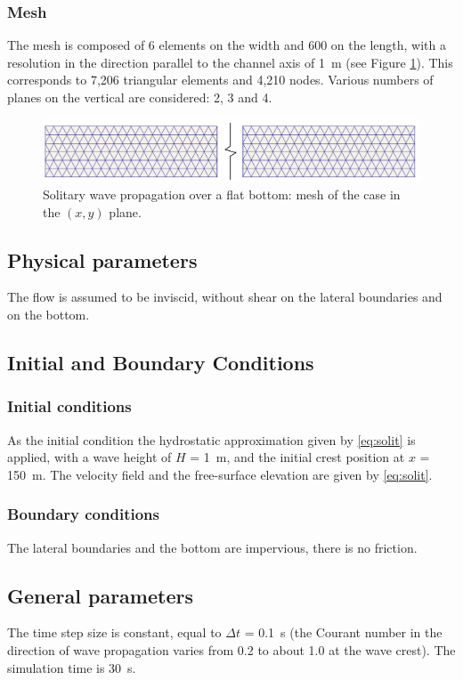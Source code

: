 \subsubsection{Mesh}
The mesh is composed of 6 elements on the width and 600 on the length,
with a resolution in the direction parallel to the channel axis of 1~m
(see Figure \ref{fig:solit_mesh}).
This corresponds to 7,206 triangular elements and 4,210 nodes.
Various numbers of planes on the vertical are considered: 2, 3 and 4.
\begin{figure}[H]
\begin{center}
  \includegraphics[scale=0.45]{img/figure2.pdf}
\end{center}
\caption{Solitary wave propagation over a flat bottom: mesh of the case in the $(x,y)$ plane.}
\label{fig:solit_mesh}
\end{figure}

\subsection{Physical parameters}
%
The flow is assumed to be inviscid, without shear on the lateral boundaries and on the bottom.
%
\subsection{Initial and Boundary Conditions}
%
\subsubsection{Initial conditions}
%
As the initial condition the hydrostatic approximation
given by \eqref{eq:solit} is applied, with a wave height of $H$ = 1~m,
and the initial crest position at $x$ = 150~m. The velocity field and the free-surface
elevation are given by \eqref{eq:solit}.
%
\subsubsection{Boundary conditions}
%
The lateral boundaries and the bottom are impervious, there is no friction.
%
\subsection{General parameters}
%
The time step size is constant, equal to $\Delta t$ = 0.1~s (the Courant number in the direction
of wave propagation varies from 0.2 to about 1.0 at the wave crest).
The simulation time is 30~s.

